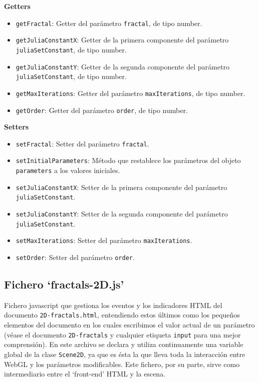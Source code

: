 \pagebreak
\textbf{Getters}
\begin{itemize}
    \item \verb|getFractal|: Getter del parámetro \verb|fractal|, de tipo number.
    \item \verb|getJuliaConstantX|: Getter de la primera componente del parámetro \verb|juliaSetConstant|, de tipo number.
    \item \verb|getJuliaConstantY|: Getter de la segunda componente del parámetro \verb|juliaSetConstant|, de tipo number.
    \item \verb|getMaxIterations|: Getter del parámetro \verb|maxIterations|, de tipo number.
    \item \verb|getOrder|: Getter del parámetro \verb|order|, de tipo number.
\end{itemize}
\textbf{Setters}
\begin{itemize}
    \item \verb|setFractal|: Setter del parámetro \verb|fractal|.
    \item \verb|setInitialParameters|: Método que restablece los parámetros del objeto \verb|parameters| a los valores iniciales.
    \item \verb|setJuliaConstantX|: Setter de la primera componente del parámetro \verb|juliaSetConstant|.
    \item \verb|setJuliaConstantY|: Setter de la segunda componente del parámetro \verb|juliaSetConstant|.
    \item \verb|setMaxIterations|: Setter del parámetro \verb|maxIterations|.
    \item \verb|setOrder|: Setter del parámetro \verb|order|.
\end{itemize}

\subsection{Fichero `fractals-2D.js'}

Fichero javascript que gestiona los eventos y los indicadores HTML del documento \verb|2D-fractals.html|, entendiendo estos últimos como los pequeños elementos del documento en los cuales escribimos el valor actual de un parámetro (véase el documento \verb|2D-fractals| y cualquier etiqueta \verb|input| para una mejor comprensión). En este archivo se declara y utiliza continuamente una variable global de la clase \verb|Scene2D|, ya que es ésta la que lleva toda la interacción entre WebGL y los parámetros modificables. Este fichero, por su parte, sirve como intermediario entre el `front-end' HTML y la escena.

